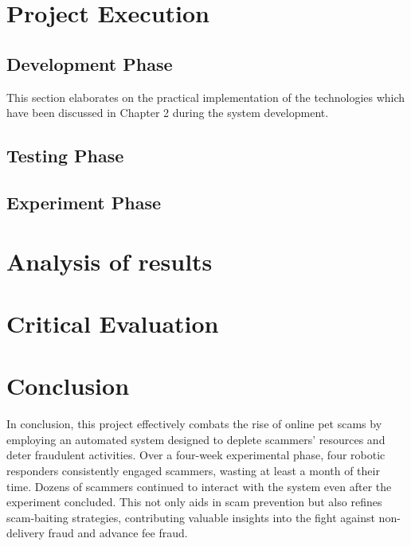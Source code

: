 \documentclass[ oneside,%
                    author={Cassie Qing Tang},
                    degree={BSc},
                     title={An Automated Response System for Disrupting Online Pet Scamming \\ },
                    subtitle={ }]{dissertation}
\begin{document}
\chapter{Project Execution}
\section{Development Phase}
This section elaborates on the practical implementation of the technologies which have been discussed in Chapter 2 during the system development.



\section{Testing Phase}




\section{Experiment Phase}






\chapter{Analysis of results}



\chapter{Critical Evaluation}









\chapter{Conclusion}
In conclusion, this project effectively combats the rise of online pet scams by employing an automated system designed to deplete scammers' resources and deter fraudulent activities. Over a four-week experimental phase, four robotic responders consistently engaged scammers, wasting at least a month of their time. Dozens of scammers continued to interact with the system even after the experiment concluded. This not only aids in scam prevention but also refines scam-baiting strategies, contributing valuable insights into the fight against non-delivery fraud and advance fee fraud.
\\
\end{document}
